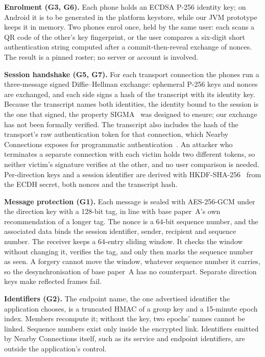 \documentclass[conference]{IEEEtran}
\begin{document}
\textbf{Enrolment (G3, G6).} Each phone holds an ECDSA P-256 identity key; on Android it is to be generated in the platform keystore, while our JVM prototype keeps it in memory. Two phones enrol once, held by the same user: each scans a QR code of the other's key fingerprint, or the user compares a six-digit short authentication string computed after a commit-then-reveal exchange of nonces. The result is a pinned roster; no server or account is involved.

\textbf{Session handshake (G5, G7).} For each transport connection the phones run a three-message signed Diffie--Hellman exchange: ephemeral P-256 keys and nonces are exchanged, and each side signs a hash of the transcript with its identity key. Because the transcript names both identities, the identity bound to the session is the one that signed, the property SIGMA~\cite{sigma2003} was designed to ensure; our exchange has not been formally verified. The transcript also includes the hash of the transport's raw authentication token for that connection, which Nearby Connections exposes for programmatic authentication~\cite{nearbydocs}. An attacker who terminates a separate connection with each victim holds two different tokens, so neither victim's signature verifies at the other, and no user comparison is needed. Per-direction keys and a session identifier are derived with HKDF-SHA-256~\cite{rfc5869} from the ECDH secret, both nonces and the transcript hash.

\textbf{Message protection (G1).} Each message is sealed with AES-256-GCM under the direction key with a 128-bit tag, in line with base paper~A's own recommendation of a longer tag. The nonce is a 64-bit sequence number, and the associated data binds the session identifier, sender, recipient and sequence number. The receiver keeps a 64-entry sliding window. It checks the window without changing it, verifies the tag, and only then marks the sequence number as seen. A forgery cannot move the window, whatever sequence number it carries, so the desynchronisation of base paper~A has no counterpart. Separate direction keys make reflected frames fail.

\textbf{Identifiers (G2).} The endpoint name, the one advertised identifier the application chooses, is a truncated HMAC of a group key and a 15-minute epoch index. Members recompute it; without the key, two epochs' names cannot be linked. Sequence numbers exist only inside the encrypted link. Identifiers emitted by Nearby Connections itself, such as its service and endpoint identifiers, are outside the application's control.
\end{document}
